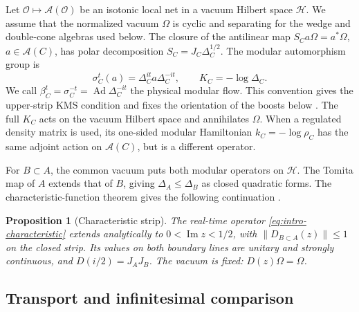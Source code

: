 \documentclass[a4paper,11pt]{article}
\newtheorem{proposition}[theorem]{Proposition}
\theoremstyle{definition}
\begin{document}
Let $\mathcal O\mapsto\mathcal A(\mathcal O)$ be an isotonic local net in a vacuum
Hilbert space $\mathcal H$. We assume that the normalized vacuum $\Omega$ is cyclic
and separating for the wedge and double-cone algebras used below. The closure of
the antilinear map $S_C a\Omega=a^*\Omega$, $a\in\mathcal A(C)$, has polar
decomposition $S_C=J_C\Delta_C^{1/2}$. The modular automorphism group is
\begin{equation}
 \sigma_C^t(a)=\Delta_C^{it}a\Delta_C^{-it},\qquad K_C=-\log\Delta_C.
 \label{eq:modular-flow}
\end{equation}
We call $\beta_C^t=\sigma_C^{-t}=\operatorname{Ad}\Delta_C^{-it}$ the physical
modular flow. This convention gives the upper-strip KMS condition and fixes the
orientation of the boosts below \cite{Takesaki1970,revolutionizing}.
The full $K_C$ acts on the vacuum Hilbert space and annihilates $\Omega$.
When a regulated density matrix is used, its one-sided modular Hamiltonian
$k_C=-\log\rho_C$ has the same adjoint action on $\mathcal A(C)$, but is a
different operator.

For $B\subset A$, the common vacuum puts both modular operators on $\mathcal H$.
The Tomita map of $A$ extends that of $B$, giving
$\Delta_A\leq\Delta_B$ as closed quadratic forms. The characteristic-function
theorem gives the following continuation \cite{revolutionizing}.

\begin{proposition}[Characteristic strip]\label{prop:characteristic-strip}
The real-time operator \eqref{eq:intro-characteristic} extends analytically to
$0<\operatorname{Im}z<1/2$, with $\|D_{B\subset A}(z)\|\leq1$ on the closed strip.
Its values on both boundary lines are unitary and strongly continuous, and
$D(i/2)=J_AJ_B$. The vacuum is fixed: $D(z)\Omega=\Omega$.
\end{proposition}

\subsection{Transport and infinitesimal comparison}
\end{document}
